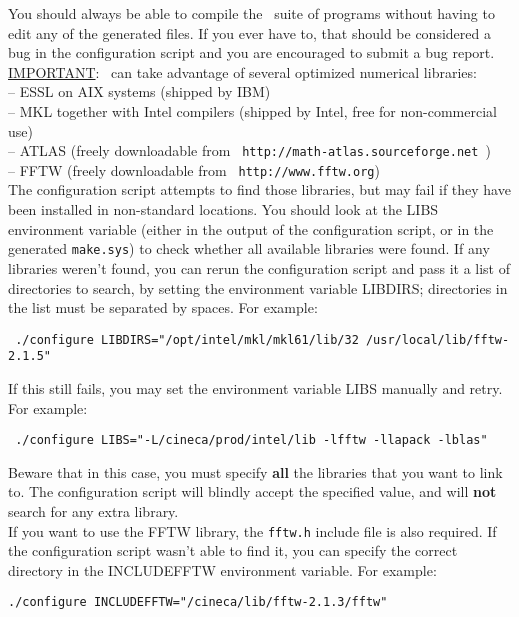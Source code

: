 \noindent You should always be able to compile the \WANT\ suite of
programs without having to edit any of the generated files.  If
you ever have to, that should be considered a bug in the
configuration script and you are encouraged to submit a bug
report.\\

\noindent \underline {IMPORTANT}: \WANT\ can take advantage of
several
optimized numerical libraries:\\
\noindent -- ESSL on AIX systems (shipped by IBM)\\
\noindent -- MKL together with Intel compilers (shipped by Intel,
free for non-commercial use)\\
\noindent -- ATLAS (freely downloadable from
   \texttt{ http://math-atlas.sourceforge.net })\\
\noindent -- FFTW (freely downloadable from
   \texttt{ http://www.fftw.org})\\

\noindent The configuration script attempts to find those
libraries, but may fail if they have been installed in
non-standard locations. You should look at the LIBS environment
variable (either in the output of the configuration script, or in
the generated {\tt make.sys}) to check whether all available
libraries were found.
If any libraries weren't found, you can rerun the
configuration script and pass it a list of directories to search,
by setting the environment variable LIBDIRS; directories in the
list must be
separated by spaces.  For example:
%
%
\begin{description}
  \item \texttt{ ./configure LIBDIRS="/opt/intel/mkl/mkl61/lib/32
  /usr/local/lib/fftw-2.1.5" }
\end{description}
%
%

\noindent If this still fails, you may set the environment
variable LIBS manually and retry.  For example:
%
%
\begin{description}
  \item \texttt{ ./configure LIBS="-L/cineca/prod/intel/lib -lfftw -llapack
  -lblas" }
\end{description}
%
%

\noindent Beware that in this case, you must specify \textbf{all} the
libraries that you want to link to.  The configuration script will
blindly accept the specified value, and will \textbf{not} search for any
extra library.\\

\noindent If you want to use the FFTW library, the \texttt{fftw.h}
include file is also required.  If the configuration script wasn't
able to find it, you can specify the correct directory in the
INCLUDEFFTW environment variable. For example:
%
%
\begin{description}
  \item {\tt ./configure INCLUDEFFTW="/cineca/lib/fftw-2.1.3/fftw" }
\end{description}
%
%

